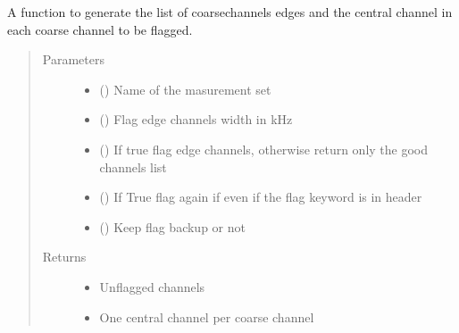 \documentclass[letterpaper,10pt,english]{sphinxmanual}
\begin{document}
\begin{fulllineitems}
\label{\detokenize{paircars:paircars.flagger.flag_MWA_coarse}}
\sphinxAtStartPar
A function to generate the list of coarse\sphinxhyphen{}channels edges and the
central channel in each coarse channel to be flagged.
\begin{quote}\begin{description}
\item[{Parameters}] \leavevmode\begin{itemize}
\item {} 
\sphinxAtStartPar
{} () \textendash{} Name of the masurement set

\item {} 
\sphinxAtStartPar
{} () \textendash{} Flag edge channels width in kHz

\item {} 
\sphinxAtStartPar
{} () \textendash{} If true flag edge channels, otherwise return only the good channels list

\item {} 
\sphinxAtStartPar
{} () \textendash{} If True flag again if even if the flag keyword is in header

\item {} 
\sphinxAtStartPar
{} () \textendash{} Keep flag backup or not

\end{itemize}

\item[{Returns}] \leavevmode
\sphinxAtStartPar
\begin{itemize}
\item {} 
\sphinxAtStartPar
{} \textendash{} Unflagged channels

\item {} 
\sphinxAtStartPar
{} \textendash{} One central channel per coarse channel

\end{itemize}


\end{description}\end{quote}

\end{fulllineitems}
\end{document}
